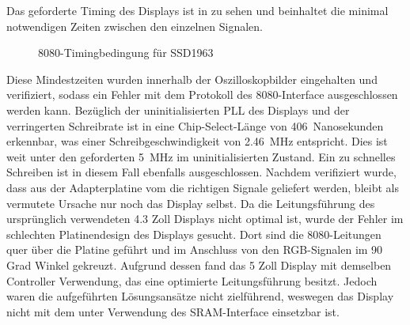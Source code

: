 \newpage
Das geforderte Timing des Displays ist in  zu sehen und beinhaltet die minimal notwendigen Zeiten zwischen den einzelnen Signalen.
\begin{figure}[htp]
	\centering
{}
	\caption{8080-Timingbedingung für SSD1963}
	\label{fig:ssd1963_timing_constraints}
\end{figure}\newline
Diese Mindestzeiten wurden innerhalb der Oszilloskopbilder eingehalten und verifiziert, sodass ein Fehler mit dem Protokoll des 8080-Interface ausgeschlossen werden kann. Bezüglich der uninitialisierten PLL des Displays und der verringerten Schreibrate ist in  eine Chip-Select-Länge von 406~Nanosekunden erkennbar, was einer Schreibgeschwindigkeit von 2.46~MHz entspricht. Dies ist weit unter den geforderten 5~MHz im uninitialisierten Zustand. Ein zu schnelles Schreiben ist in diesem Fall ebenfalls ausgeschlossen. Nachdem verifiziert wurde, dass aus der Adapterplatine vom  die richtigen Signale geliefert werden, bleibt als vermutete Ursache nur noch das Display selbst. Da die Leitungsführung des ursprünglich verwendeten 4.3 Zoll Displays nicht optimal ist, wurde der Fehler im schlechten Platinendesign des Displays gesucht.
Dort sind die 8080-Leitungen quer über die Platine geführt und im Anschluss von den RGB-Signalen im 90 Grad Winkel gekreuzt. Aufgrund dessen fand das 5 Zoll Display mit demselben Controller Verwendung, das eine optimierte Leitungsführung besitzt. Jedoch waren die aufgeführten Lösungsansätze nicht zielführend, weswegen das Display nicht mit dem  unter Verwendung des SRAM-Interface einsetzbar ist.